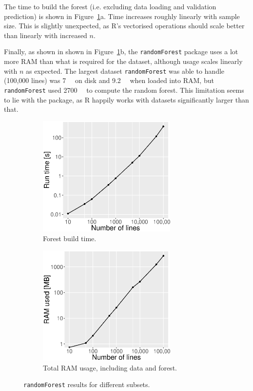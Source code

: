 \documentclass{article}
\begin{document}
The time to build the forest (i.e. excluding data loading and validation prediction) is shown in Figure~\ref{rf}a. Time increases roughly linearly with sample size. This is slightly unexpected, as R's vectorised operations should scale better than linearly with increased $n$.

Finally, as shown in shown in Figure~\ref{rf}b, the \texttt{randomForest} package uses a lot more RAM than what is required for the dataset, although usage scales linearly with $n$ as expected. The largest dataset \texttt{randomForest} was able to handle (100,000 lines) was \SI{7}{\mega\byte} on disk and \SI{9.2}{\mega\byte} when loaded into RAM, but \texttt{randomForest} used \SI{2700}{\mega\byte} to compute the random forest. This limitation seems to lie with the package, as R happily works with datasets significantly larger than that.

\begin{figure}[ht]
    \begin{subfigure}[t]{0.49\textwidth}
        \centering
        \includegraphics[height=6cm]{rf_time.eps}
        \caption{Forest build time.}
    \end{subfigure}%
    \begin{subfigure}[t]{0.49\textwidth}
        \centering
        \includegraphics[height=6cm]{rf_ram.eps}
        \caption{Total RAM usage, including data and forest.}
    \end{subfigure}
    \caption{\label{rf} \texttt{randomForest} results for different subsets.}
\end{figure}
\end{document}
